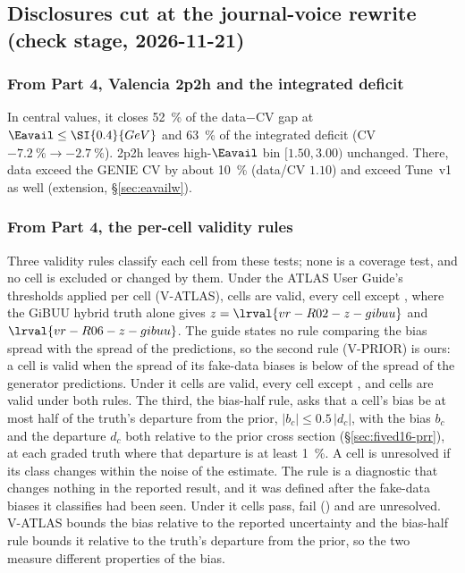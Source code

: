 \subsection{Disclosures cut at the journal-voice rewrite (check stage, 2026-11-21)}

\subsubsection{From Part 4, Valencia 2p2h and the integrated deficit}
In central values, it closes \SI{52}{\percent} of the data$-$CV gap at $\Eavail\le\SI{0.4}{GeV}$ and \SI{63}{\percent} of the integrated deficit (CV $-\SI{7.2}{\percent}\to-\SI{2.7}{\percent}$).
2p2h leaves high-$\Eavail$ bin $[1.50,3.00)$ unchanged. There, data exceed the GENIE CV by about \SI{10}{\percent} (data/CV $1.10$) and exceed Tune~v1 as well (extension, \S\ref{sec:eavailw}).

\subsubsection{From Part 4, the per-cell validity rules}
Three validity rules classify each cell from these tests; none is a coverage test, and no cell is excluded or changed by them. Under the ATLAS User Guide's thresholds applied per cell (V-ATLAS),  cells are valid, every cell except , where the GiBUU hybrid truth alone gives $z=\lrval{vr-R02-z-gibuu}$ and $\lrval{vr-R06-z-gibuu}$. The guide states no rule comparing the bias spread with the spread of the predictions, so the second rule (V-PRIOR) is ours: a cell is valid when the spread of its fake-data biases is below  of the spread of the generator predictions. Under it  cells are valid, every cell except , and  cells are valid under both rules. The third, the bias-half rule, asks that a cell's bias be at most half of the truth's departure from the prior, $|b_c|\leq0.5\,|d_c|$, with the bias $b_c$ and the departure $d_c$ both relative to the prior cross section (\S\ref{sec:fived16-prr}), at each graded truth where that departure is at least \SI{1}{\percent}. A cell is unresolved if its class changes within the noise of the estimate. The rule is a diagnostic that changes nothing in the reported result, and it was defined after the fake-data biases it classifies had been seen. Under it  cells pass,  fail () and  are unresolved. V-ATLAS bounds the bias relative to the reported uncertainty and the bias-half rule bounds it relative to the truth's departure from the prior, so the two measure different properties of the bias.

